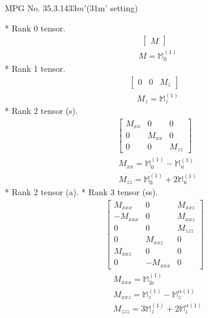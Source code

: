 \documentclass[fleqn,8pt,landscape]{jsarticle}
\begin{document}
\setcounter{MaxMatrixCols}{32}

\renewcommand{\tablename}{Table~}
\renewcommand{\figurename}{Figure~}
\begin{center}
\LARGE
MPG No. 35.3.143\quad$3m'$\quad(31m' setting)
\end{center}
* Rank 0 tensor.
\begin{align*}
\begin{bmatrix} M \end{bmatrix}
\end{align*}
\begin{align*}
& M = \mathbb{M}_{0}^{(1)}
\end{align*}
* Rank 1 tensor.
\begin{align*}
\begin{bmatrix} 0 & 0 & M_{z} \end{bmatrix}
\end{align*}
\begin{align*}
& M_{z} = \mathbb{M}_{z}^{(1)}
\end{align*}
* Rank 2 tensor (s).
\begin{align*}
\begin{bmatrix} M_{xx} & 0 & 0 \\ 0 & M_{xx} & 0 \\ 0 & 0 & M_{zz} \end{bmatrix}
\end{align*}
\begin{align*}
& M_{xx} = \mathbb{M}_{0}^{(1)} - \mathbb{M}_{u}^{(1)} \\
& M_{zz} = \mathbb{M}_{0}^{(1)} + 2 \mathbb{M}_{u}^{(1)}
\end{align*}
* Rank 2 tensor (a).
* Rank 3 tensor (ss).
\begin{align*}
\begin{bmatrix} M_{xxx} & 0 & M_{xxz} \\ - M_{xxx} & 0 & M_{xxz} \\ 0 & 0 & M_{zzz} \\ 0 & M_{xxz} & 0 \\ M_{xxz} & 0 & 0 \\ 0 & - M_{xxx} & 0 \end{bmatrix}
\end{align*}
\begin{align*}
& M_{xxx} = \mathbb{M}_{3c}^{(1)} \\
& M_{xxz} = \mathbb{M}_{z}^{(1)} - \mathbb{M}_{z}^{\alpha(1)} \\
& M_{zzz} = 3 \mathbb{M}_{z}^{(1)} + 2 \mathbb{M}_{z}^{\alpha(1)}
\end{align*}
\end{document}
